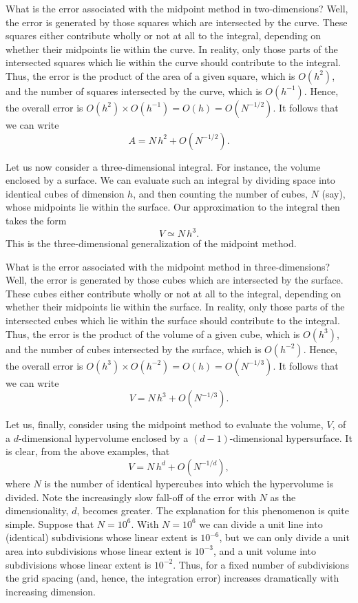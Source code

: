 What is the error associated with the midpoint method in two-dimensions? Well, the error
is generated by those squares which are intersected by the curve. These squares either
contribute wholly or not at all to the integral, depending on whether their midpoints
lie within the curve. In reality, only those parts of the intersected squares which lie
within the curve should contribute to the integral. Thus, the error is the product of
the area of a given square, which is $O(h^2)$, and the number of squares intersected
by the curve, which is $O(h^{-1})$. Hence, the overall error is $O(h^2)\times O(h^{-1}) = 
O(h)= O(N^{-1/2})$. It follows that we can write
\begin{equation}
A = N\,h^2 + O(N^{-1/2}).
\end{equation}

Let us now consider a three-dimensional integral. For instance, the volume enclosed by a surface.
We can evaluate such an integral by dividing space into identical cubes of dimension $h$,
and then counting the number of cubes, $N$ (say), whose midpoints lie within the surface.
Our approximation to the integral  then takes the form
\begin{equation}
V \simeq N\,h^3.
\end{equation}
This is the three-dimensional generalization of the midpoint method.

What is the error associated with the midpoint method in three-dimensions? Well, the error
is generated by those cubes which are intersected by the surface. These cubes either
contribute wholly or not at all to the integral, depending on whether their midpoints
lie within the surface. In reality, only those parts of the intersected cubes which lie
within the surface should contribute to the integral. Thus, the error is the product of
the volume of a given cube, which is $O(h^3)$, and the number of cubes intersected
by the surface, which is $O(h^{-2})$. Hence, the overall error is $O(h^3)\times O(h^{-2}) = 
O(h)= O(N^{-1/3})$. It follows that we can write
\begin{equation}
V = N\,h^3 + O(N^{-1/3}).
\end{equation}

Let us, finally, consider using the midpoint method to evaluate the volume, $V$, of a $d$-dimensional
hypervolume enclosed by a $(d-1)$-dimensional hypersurface. It is clear, from the above examples,
that
\begin{equation}
V = N\,h^d + O(N^{-1/d}),
\end{equation}
where $N$ is the number of identical hypercubes into which the hypervolume is divided.
Note the increasingly slow fall-off of the error with $N$ as the dimensionality, $d$,
becomes greater. The explanation for this phenomenon is quite simple. Suppose that $N=10^6$.
With $N=10^6$  we can divide a unit line into (identical) subdivisions whose linear extent
is $10^{-6}$, but we can only divide a unit  area into subdivisions whose linear extent
is $10^{-3}$, and a   unit volume into subdivisions whose linear extent
is $10^{-2}$. Thus, for a fixed number of subdivisions the grid spacing (and, hence, the
integration error) increases dramatically
with increasing dimension.


